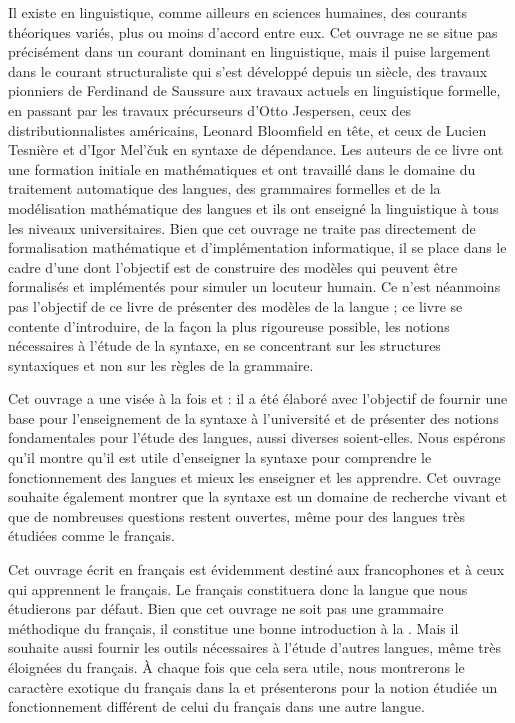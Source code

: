 Il existe en linguistique, comme ailleurs en sciences humaines, des courants théoriques variés, plus ou moins d’accord entre eux. Cet ouvrage ne se situe pas précisément dans un courant dominant en linguistique, mais il puise largement dans le courant structuraliste qui s’est développé depuis un siècle, des travaux pionniers de Ferdinand de Saussure aux travaux actuels en linguistique formelle, en passant par les travaux précurseurs d’Otto Jespersen, ceux des distributionnalistes américains, Leonard Bloomfield en tête, et ceux de Lucien Tesnière et d’Igor Mel’čuk en syntaxe de dépendance. Les auteurs de ce livre ont une formation initiale en mathématiques et ont travaillé dans le domaine du traitement automatique des langues, des grammaires formelles et de la modélisation mathématique des langues et ils ont enseigné la linguistique à tous les niveaux universitaires. Bien que cet ouvrage ne traite pas directement de formalisation mathématique et d’implémentation informatique, il se place dans le cadre d’une  dont l’objectif est de construire des modèles qui peuvent être formalisés et implémentés pour simuler un locuteur humain. Ce n’est néanmoins pas l’objectif de ce livre de présenter des modèles de la langue ; ce livre se contente d’introduire, de la façon la plus rigoureuse possible, les notions nécessaires à l’étude de la syntaxe, en se concentrant sur les structures syntaxiques et non sur les règles de la grammaire.

Cet ouvrage a une visée à la fois  et : il a été élaboré avec l’objectif de fournir une base pour l’enseignement de la syntaxe à l’université et de présenter des notions fondamentales pour l’étude des langues, aussi diverses soient-elles. Nous espérons qu’il montre qu’il est utile d’enseigner la syntaxe pour comprendre le fonctionnement des langues et mieux les enseigner et les apprendre. Cet ouvrage souhaite également montrer que la syntaxe est un domaine de recherche vivant et que de nombreuses questions restent ouvertes, même pour des langues très étudiées comme le français.

Cet ouvrage écrit en français est évidemment destiné aux francophones et à ceux qui apprennent le français. Le français constituera donc la langue que nous étudierons par défaut. Bien que cet ouvrage ne soit pas une grammaire méthodique du français, il constitue une bonne introduction à la . Mais il souhaite aussi fournir les outils nécessaires à l’étude d’autres langues, même très éloignées du français. À chaque fois que cela sera utile, nous montrerons le caractère exotique du français dans la  et présenterons pour la notion étudiée un fonctionnement différent de celui du français dans une autre langue.\largerpage



